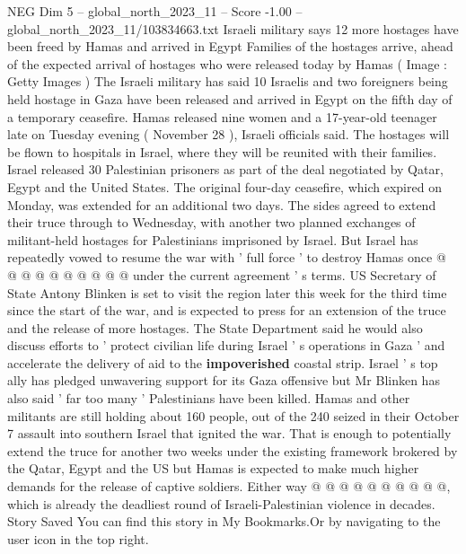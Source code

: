 \begin{textsample}{NEG Dim 5 – global\_north\_2023\_11 – Score -1.00 – global\_north\_2023\_11/103834663.txt}  \label{ex:f5_neg_047}
Israeli military says 12 more hostages have been freed by Hamas and arrived in Egypt Families of the hostages arrive, ahead of the expected arrival of hostages who were released today by Hamas ( Image : Getty Images ) The Israeli military has said 10 Israelis and two foreigners being held hostage in Gaza have been released and arrived in Egypt on the fifth day of a temporary ceasefire.
Hamas released nine women and a 17-year-old teenager late on Tuesday evening ( November 28 ), Israeli officials said.
The hostages will be flown to hospitals in Israel, where they will be reunited with their families.
Israel released 30 Palestinian prisoners as part of the deal negotiated by Qatar, Egypt and the United States.
The original four-day ceasefire, which expired on Monday, was extended for an additional two days.
The sides agreed to extend their truce through to Wednesday, with another two planned exchanges of militant-held hostages for Palestinians imprisoned by Israel.
But Israel has repeatedly vowed to resume the war with ' full force ' to destroy Hamas once @ @ @ @ @ @ @ @ @ @ under the current agreement ' s terms.
US Secretary of State Antony Blinken is set to visit the region later this week for the third time since the start of the war, and is expected to press for an extension of the truce and the release of more hostages.
The State Department said he would also discuss efforts to ' protect civilian life during Israel ' s operations in Gaza ' and accelerate the delivery of aid to the \textbf{impoverished} coastal strip.
Israel ' s top ally has pledged unwavering support for its Gaza offensive but Mr Blinken has also said ' far too many ' Palestinians have been killed.
Hamas and other militants are still holding about 160 people, out of the 240 seized in their October 7 assault into southern Israel that ignited the war.
That is enough to potentially extend the truce for another two weeks under the existing framework brokered by the Qatar, Egypt and the US but Hamas is expected to make much higher demands for the release of captive soldiers.
Either way @ @ @ @ @ @ @ @ @ @, which is already the deadliest round of Israeli-Palestinian violence in decades.
Story Saved You can find this story in My Bookmarks.Or by navigating to the user icon in the top right.

\end{textsample}
